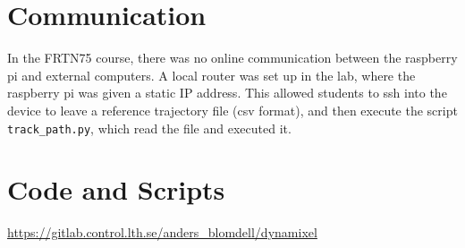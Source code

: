 \documentclass[10pt,a4paper]{article}
\begin{document}
	\section{Communication}
	In the FRTN75 course, there was no online communication between the raspberry pi and external computers. A local router was set up in the lab, where the raspberry pi was given a static IP address. This allowed students to ssh into the device to leave a reference trajectory file (csv format), and then execute the script \texttt{track\_path.py}, which read the file and executed it.
	
	\section{Code and Scripts}
	
	
	
	\url{https://gitlab.control.lth.se/anders_blomdell/dynamixel}
\end{document}
